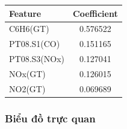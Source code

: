 \begin{center}
\begin{tabular}{|l|c|}
\hline
\textbf{Feature} & \textbf{Coefficient} \\
\hline
C6H6(GT) & 0.576522 \\
PT08.S1(CO) & 0.151165 \\
PT08.S3(NOx) & 0.127041 \\
NOx(GT) & 0.126015 \\
NO2(GT) & 0.069689 \\
\hline
\end{tabular}
\end{center}

\subsubsection{Biểu đồ trực quan}
